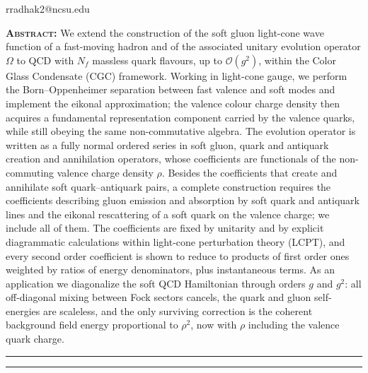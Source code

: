 \documentclass[11pt,a4paper]{article}
\numberwithin{equation}{section}
\newcommand{\OM}{\Omega}
\newcommand{\order}[1]{\mathcal{O}(#1)}
\newcommand{\Nf}{N_{f}}
\begin{document}
\thispagestyle{plain}
\vspace{1.4cm}


\vspace{0.9cm}

\vspace{0.25cm}

\vspace{0.25cm}
 {\small\ttfamily rradhak2@ncsu.edu}

\vspace{0.8cm}
\noindent\textbf{\scshape Abstract:} We extend the construction of the soft gluon light-cone
wave function of a fast-moving hadron and of the associated unitary evolution operator $\OM$ to
QCD with $\Nf$ massless quark flavours, up to $\order{g^{2}}$, within the Color Glass
Condensate (CGC) framework. Working in light-cone gauge, we perform the Born--Oppenheimer
separation between fast valence and soft modes and implement the eikonal approximation; the
valence colour charge density then acquires a fundamental representation component carried by
the valence quarks, while still obeying the same non-commutative algebra. The evolution
operator is written as a fully normal ordered series in soft gluon, quark and antiquark creation
and annihilation operators, whose coefficients are functionals of the non-commuting valence
charge density $\rho$. Besides the coefficients that create and annihilate soft
quark--antiquark pairs, a complete construction requires the coefficients describing gluon
emission and absorption by soft quark and antiquark lines and the eikonal rescattering of a
soft quark on the valence charge; we include all of them. The coefficients are fixed by
unitarity and by explicit diagrammatic calculations within light-cone perturbation theory
(LCPT), and every second order coefficient is shown to reduce to products of first order ones
weighted by ratios of energy denominators, plus instantaneous terms. As an application we
diagonalize the soft QCD Hamiltonian through orders $g$ and $g^{2}$: all off-diagonal mixing
between Fock sectors cancels, the quark and gluon self-energies are scaleless, and the only
surviving correction is the coherent background field energy proportional to $\rho^{2}$, now
with $\rho$ including the valence quark charge.

\vspace{0.6cm}
\hrule
\tableofcontents
\vspace{0.3cm}
\hrule
\newpage












\appendix



\end{document}

